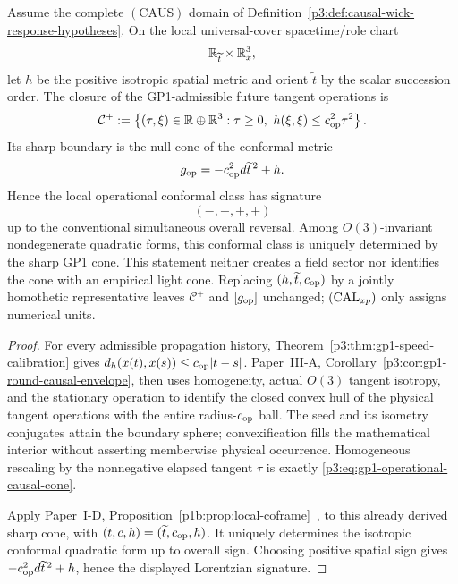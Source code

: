 \documentclass[12pt,a4paper]{article}
\begin{document}
\begin{theorem}
\label{p3:thm:lorentzian-signature}
Assume the complete \((\mathrm{CAUS})\) domain of
Definition~\ref{p3:def:causal-wick-response-hypotheses}.  On the local
universal-cover spacetime/role chart
\[
        \mathbb{R}_{\widetilde t}\times\mathbb{R}^3_x,
\]
let \(h\) be the positive isotropic spatial metric and orient
\(\widetilde t\) by the scalar succession order.  The closure of the
GP1-admissible future tangent operations is
\begin{equation}
\label{p3:eq:gp1-operational-causal-cone}
\mathcal C^+
:=
\left\{(\tau,\xi)\in\mathbb R\oplus\mathbb R^3:
\tau\ge0,\ h(\xi,\xi)\le c_{\rm op}^2\tau^2\right\}.
\end{equation}
Its sharp boundary is the null cone of the conformal metric
\[
 g_{\rm op}=-c_{\rm op}^2d\widetilde t^{\,2}+h.
\]
Hence the local operational conformal class has signature
\[
        \boxed{(-,+,+,+)}
\]
up to the conventional simultaneous overall reversal.  Among
\(O(3)\)-invariant nondegenerate quadratic forms, this conformal class is
uniquely determined by the sharp GP1 cone.  This statement neither creates a
field sector nor identifies the cone with an empirical light cone.  Replacing
\((h,\widetilde t,c_{\rm op})\) by a jointly homothetic representative leaves
\(\mathcal C^+\) and \([g_{\rm op}]\) unchanged; \(({\rm CAL}_{xp})\) only
assigns numerical units.
\end{theorem}

\begin{proof}
For every admissible propagation history,
Theorem~\ref{p3:thm:gp1-speed-calibration} gives
\(d_h(x(t),x(s))\le c_{\rm op}|t-s|\).  Paper~III-A,
Corollary~\ref{p3:cor:gp1-round-causal-envelope}, then uses homogeneity,
actual \(O(3)\) tangent isotropy, and the stationary operation to identify the
closed convex hull of the physical tangent operations with the entire
radius-\(c_{\rm op}\) ball.  The seed and its isometry conjugates attain the
boundary sphere; convexification fills the mathematical interior without
asserting memberwise physical occurrence.
Homogeneous rescaling by the nonnegative
elapsed tangent \(\tau\) is exactly
\eqref{p3:eq:gp1-operational-causal-cone}.

Apply Paper~I-D, Proposition~\ref{p1b:prop:local-coframe}~\cite{Kugelmann2026Paper1D},
to this already derived sharp cone, with
\((t,c,h)=(\widetilde t,c_{\rm op},h)\).  It uniquely determines the
isotropic conformal quadratic form up to overall sign.  Choosing positive
spatial sign gives \(-c_{\rm op}^2d\widetilde t^{\,2}+h\), hence the
displayed Lorentzian signature.
\end{proof}
\end{document}
